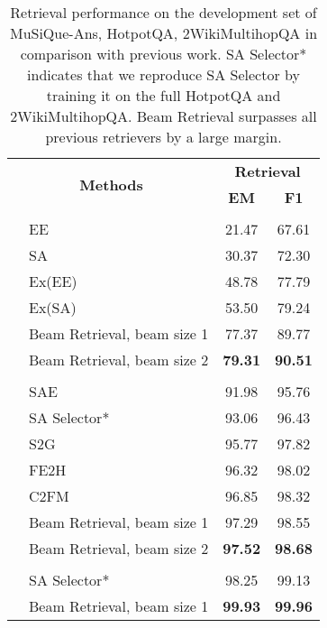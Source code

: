 \documentclass[10.5pt]{article}
\begin{document}
\begin{table}[htb]
\centering
\begin{tabular}{cl|cc}
\hline
\multicolumn{2}{c|}{\multirow{2}{*}{\textbf{Methods}}} & \multicolumn{2}{c}{\textbf{Retrieval}} \\ \cline{3-4} 
\multicolumn{2}{c|}{}                             & \textbf{EM}    & \textbf{F1}    \\ \hline
\rowcolor{gray!10} \multicolumn{4}{c}{\textbf{\textsl{MuSiQue-Ans}}} \\ \hline
                    & EE \cite{musique}               
                    & 21.47 & 67.61   \\
                   & SA \cite{musique}               
                    & 30.37 & 72.30         \\
& Ex(EE) \cite{musique}               
                    & 48.78 & 77.79      \\
& Ex(SA) \cite{musique}                
                    & 53.50 & 79.24     \\
& Beam Retrieval, beam size 1 & 77.37 & 89.77       \\ 
                    & Beam Retrieval, beam size 2 & \textbf{79.31} & \textbf{90.51}       \\ 
                    \hline
                    \rowcolor{gray!10} \multicolumn{4}{c}{\textbf{\textsl{HotpotQA}}} \\ \hline
&SAE \cite{DBLP:conf/aaai/TuHW0HZ20}     & 91.98     & 95.76  \\
        &SA Selector* \cite{musique}               & 93.06 & 96.43         \\
        &S2G \cite{DBLP:journals/corr/abs-2107-11823}  & 95.77     & 97.82 \\
&FE2H \cite{DBLP:journals/corr/abs-2205-11729} & 96.32     & 98.02 \\
        &C2FM \cite{DBLP:journals/corr/abs-2212-09512} & 96.85     & 98.32 \\
        &Beam Retrieval, beam size 1 & 97.29 & 98.55 \\
        &Beam Retrieval, beam size 2 & \textbf{97.52} & \textbf{98.68} \\
        \hline
        \rowcolor{gray!10} \multicolumn{4}{c}{\textbf{\textsl{2WikiMultihopQA}}} \\ \hline
        &SA Selector* \cite{musique}               & 98.25 & 99.13         \\
&Beam Retrieval, beam size 1 & \textbf{99.93} & \textbf{99.96} \\
                    \hline
\end{tabular}
\caption{Retrieval performance on the development set of MuSiQue-Ans, HotpotQA, 2WikiMultihopQA in comparison with previous work. SA Selector* indicates that we reproduce SA Selector by training it on the full HotpotQA and 2WikiMultihopQA. Beam Retrieval surpasses all previous retrievers by a large margin.}
\label{tab:retr_performance}
\end{table}
\end{document}
